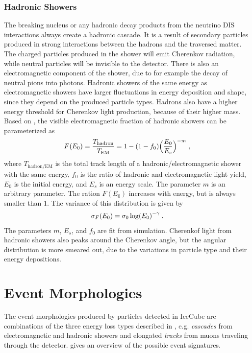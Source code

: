 \subsubsection{Hadronic Showers}

The breaking nucleus or any hadronic decay products from the neutrino DIS interactions always create a hadronic cascade. It is a result of secondary particles produced in strong interactions between the hadrons and the traversed matter. The charged particles produced in the shower will emit Cherenkov radiation, while neutral particles will be invisible to the detector. There is also an electromagnetic component of the shower, due to for example the decay of neutral pions into photons. Hadronic showers of the same energy as electromagnetic showers have larger fluctuations in energy deposition and shape, since they depend on the produced particle types. Hadrons also have a higher energy threshold for Cherenkov light production, because of their higher mass. Based on , the visible electromagnetic fraction of hadronic showers can be parameterized as
\begin{equation}
    F(E_0) = \frac{T_\mathrm{hadron}}{T_\mathrm{EM}} = 1 - (1 - f_0)\Big(\frac{E_0}{E_s}\Big)^{-m}
    \;,
    \labeq{hadronic_shower_fraction}
\end{equation}
where $T_\mathrm{hadron/EM}$ is the total track length of a hadronic/electromagnetic shower with the same energy, $f_0$ is the ratio of hadronic and electromagnetic light yield, $E_0$ is the initial energy, and $E_s$ is an energy scale. The parameter $m$ is an arbitrary parameter. The ration $F(E_0)$ increases with energy, but is always smaller than $1$. The variance of this distribution is given by
\begin{equation}
    \sigma_F(E_0) = \sigma_0 \log(E_0)^{-\gamma}
    \;.
    \labeq{hadronic_shower_fraction_variance}
\end{equation}
The parameters $m$, $E_s$, and $f_0$ are fit from simulation. Cherenkof light from hadronic showers also peaks around the Cherenkov angle, but the angular distribution is more smeared out, due to the variations in particle type and their energy depositions.


\section{Event Morphologies} 

The event morphologies produced by particles detected in IceCube are combinations of the three energy loss types described in , e.g. \textit{cascades} from electromagnetic and hadronic showers and elongated \textit{tracks} from muons traveling through the detector.  gives an overview of the possible event signatures.

